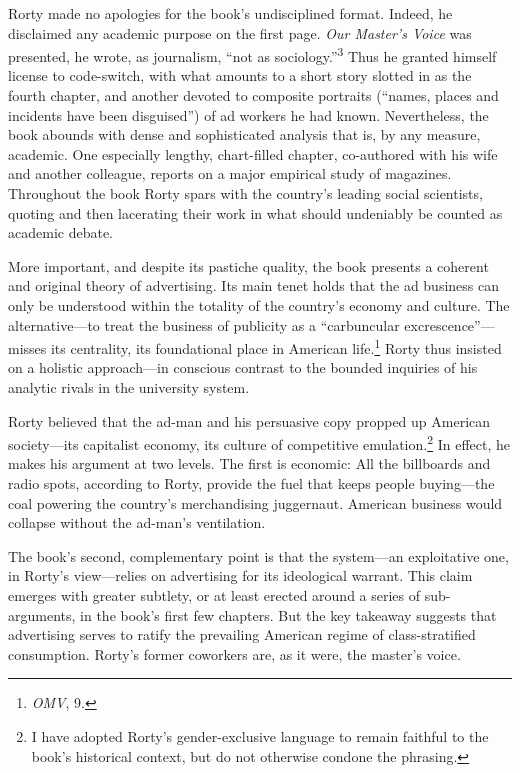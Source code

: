 \documentclass[twoside,nohyper,openany,nobib]{tufte-book}
\begin{document}
Rorty made no apologies for the book's undisciplined format. Indeed, he
disclaimed any academic purpose on the first page. \emph{Our Master's
Voice} was presented, he wrote, as journalism, ``not as sociology.''\textsuperscript{3}
Thus he granted himself license to code-switch, with what amounts to a
short story slotted in as the fourth chapter, and another devoted \setcounter{footnote}{3}to
composite portraits (``names, places and incidents have been
disguised'') of ad workers he had known. Nevertheless, the book abounds
with dense and sophisticated analysis that is, by any measure, academic.
One especially lengthy, chart-filled chapter, co-authored with his wife
and another colleague, reports on a major empirical study of magazines.
Throughout the book Rorty spars with the country's leading social
scientists, quoting and then lacerating their work in what should
undeniably be counted as academic debate.

More important, and despite its pastiche quality, the book presents a
coherent and original theory of advertising. Its main tenet holds that
the ad business can only be understood within the totality of the
country's economy and culture. The alternative---to treat the business
of publicity as a ``carbuncular excrescence''---misses its centrality,
its foundational place in American life.\footnote{\emph{OMV}, 9.} Rorty thus insisted on a
holistic approach---in conscious contrast to the bounded inquiries of
his analytic rivals in the university system.

Rorty believed that the ad-man and his persuasive copy propped up
American society---its capitalist economy, its culture of competitive
emulation.\footnote{I have adopted Rorty's gender-exclusive language to remain faithful to
  the book's historical context, but do not otherwise condone the
  phrasing.
} In effect, he makes his argument at two levels. The first
is economic: All the billboards and radio spots, according to Rorty,
provide the fuel that keeps people buying---the coal powering the
country's merchandising juggernaut. American business would collapse
without the ad-man's ventilation.

The book's second, complementary point is that the system---an
exploitative one, in Rorty's view---relies on advertising for its
ideological warrant. This claim emerges with greater subtlety, or at
least erected around a series of sub-arguments, in the book's first few
chapters. But the key takeaway suggests that advertising serves to
ratify the prevailing American regime of class-stratified consumption.
Rorty's former coworkers are, as it were, the master's voice.
\end{document}
